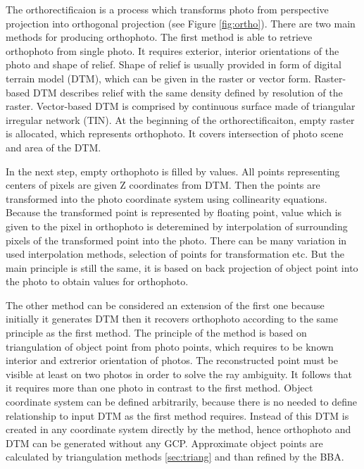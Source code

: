 \documentclass[a4paper,12pt]{article}
\begin{document}

The orthorectificaion is a process which transforms photo from perspective projection into orthogonal projection (see Figure \ref{fig:ortho}). 
\label{sec:single_ortho}
There are two main methods for producing orthophoto. The first method is able to retrieve orthophoto 
from single photo. It requires exterior, interior orientations of the photo and shape of relief. 
Shape of relief is usually provided in form of digital terrain model (DTM), which 
can be given in the raster or vector form. Raster-based DTM describes relief with the same density defined by resolution of the raster.
Vector-based DTM is comprised by continuous surface made of triangular irregular network (TIN). 
At the beginning of the orthorectificaiton, empty raster is allocated, which represents orthophoto.
It covers intersection of photo scene and area of the DTM.

In the next step, empty orthophoto is filled by values. 
All points representing centers of pixels are given Z coordinates from DTM. 
Then the points are transformed into the photo coordinate system using collinearity equations.
Because the transformed point is represented by floating point, value which is given 
to the pixel in orthophoto is deteremined by interpolation of surrounding pixels of the transformed 
point into the photo. There can be many variation in used interpolation methods, selection of points 
for transformation etc. 
But the main principle is still the same, it is based on back projection of object point into 
the photo to obtain values for orthophoto.


The other method can be considered an extension of the first one because initially it generates DTM then it recovers orthophoto 
according to the same principle as the first method. The principle of the method is based on triangulation of object point
from photo points, which requires to be known interior and extrerior orientation of photos. The reconstructed point 
must be visible at least on two photos in order to solve the ray ambiguity. It follows that it requires more than 
one photo in contrast to the first method.
Object coordinate system 
can be defined arbitrarily, because there is no needed to define relationship to input DTM as the first method requires.
Instead of this DTM is created in any coordinate system directly by the method,
hence orthophoto and DTM can be generated without any GCP. 
Approximate object points  are calculated by triangulation 
methods \ref{sec:triang} and than refined by the BBA. 
\end{document}
